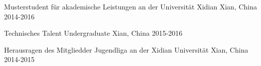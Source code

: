 
\begin{cvhonors}
	
	 \cvhonor
	{Musterstudent für akademische Leistungen an der Universität Xidian } %
	{} %
	{Xian, China} %
	{2014-2016} %

	\cvhonor
	{Technisches Talent Undergraduate} %
	{} %
	{Xian, China} %
	{2015-2016} %
	
	\cvhonor
	{Herausragen des Mitgliedder Jugendliga an der Xidian Universität} %
	{} %
	{Xian, China} %
	{2014-2015} %
	
\end{cvhonors}





